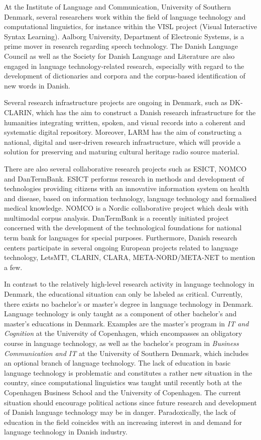 \begin{multicols}{2}
At the Institute of Language and Communication, University of Southern Denmark, several researchers work within the field of language technology and computational linguistics, for instance within the VISL project (Visual Interactive Syntax Learning). Aalborg University, Department of Electronic Systems, is a prime mover in research regarding speech technology. The Danish Language Council as well as the Society for Danish Language and Literature are also engaged in language technology-related research, especially with regard to the development of dictionaries and corpora and the corpus-based identification of new words in Danish. 

Several research infrastructure projects are ongoing in Denmark, such as DK-CLARIN, which has the aim to construct a Danish research infrastructure for the humanities integrating written, spoken, and visual records into a coherent and systematic digital repository. Moreover, LARM has the aim of constructing a national, digital and user-driven research infrastructure, which will provide a solution for preserving and maturing cultural heritage radio source material. 

There are also several collaborative research projects such as ESICT, NOMCO and DanTermBank. ESICT performs research in methods and development of technologies providing citizens with an innovative information system on health and disease, based on information technology, language technology and formalised medical knowledge. NOMCO is a Nordic collaborative project which deals with multimodal corpus analysis. DanTermBank is a recently initiated project concerned with the development of the technological foundations for national term bank for languages for special purposes. Furthermore, Danish research centers participate in several ongoing European projects related to language technology, LetsMT!, CLARIN, CLARA, META-NORD/META-NET  to mention a few.

In contrast to the relatively high-level research activity in language technology in Denmark, the educational situation can only be labeled as critical. Currently, there exists no bachelor's or master's degree in language technology in Denmark. Language technology is only taught as a component of other bachelor's and master's educations in Denmark. Examples are the master's program in {\it IT and Cognition} at the University of Copenhagen, which encompasses an obligatory course in language technology, as well as the bachelor's program in {\it Business Communication and IT} at the University of Southern Denmark, which includes an optional branch of language technology. The lack of education in basic language technology is problematic and constitutes a rather new situation in the country, since computational linguistics was taught until recently both at the Copenhagen Business School and the University of Copenhagen. The current situation should encourage political actions since future research and development of Danish language technology may be in danger. Paradoxically, the lack of education in the field coincides with an increasing interest in and demand for language technology in Danish industry. 


\end{multicols}
